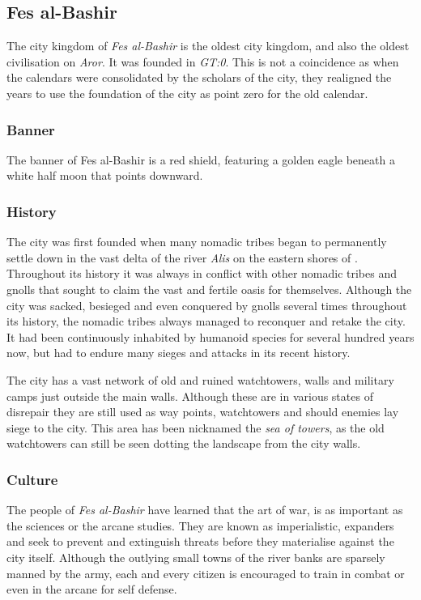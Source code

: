 \subsection{Fes al-Bashir}
\label{sec:Fes al-Bashir}

The city kingdom of \emph{Fes al-Bashir} is the oldest city kingdom, and also
the oldest civilisation on \emph{Aror}. It was founded in \emph{GT:0}. This is
not a coincidence as when the calendars were consolidated by the scholars of
the city, they realigned the years to use the foundation of the city as point
zero for the old calendar.

\subsubsection*{Banner}

The banner of Fes al-Bashir is a red shield, featuring a golden eagle beneath
a white half moon that points downward.

\subsubsection*{History}

The city was first founded when many nomadic tribes began to permanently
settle down in the vast delta of the river \emph{Alis} on the eastern shores
of . Throughout its history it was always in conflict with
other nomadic tribes and gnolls that sought to claim the vast and fertile
oasis for themselves. Although the city was sacked, besieged and even
conquered by gnolls several times throughout its history, the nomadic tribes
always managed to reconquer and retake the city. It had been continuously
inhabited by humanoid species for several hundred years now, but had to endure
many sieges and attacks in its recent history.

The city has a vast network of old and ruined watchtowers, walls and military
camps just outside the main walls. Although these are in various states of
disrepair they are still used as way points, watchtowers and should enemies
lay siege to the city. This area has been nicknamed the \emph{sea of towers},
as the old watchtowers can still be seen dotting the landscape from the city
walls.

\subsubsection*{Culture}

The people of \emph{Fes al-Bashir} have learned that the art of war, is as
important as the sciences or the arcane studies. They are known as
imperialistic, expanders and seek to prevent and extinguish threats before
they materialise against the city itself. Although the outlying small towns of
the river banks are sparsely manned by the army, each and every citizen is
encouraged to train in combat or even in the arcane for self defense.

